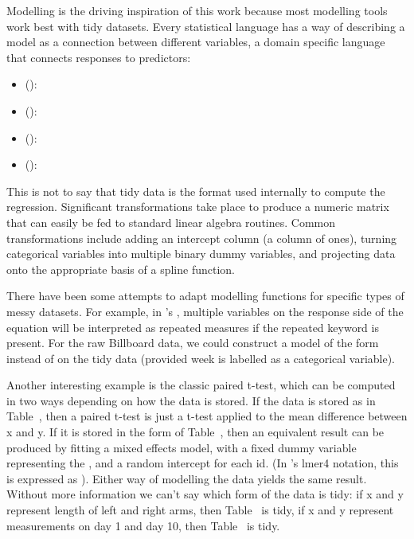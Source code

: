 \documentclass[article]{jss}
\begin{document}
Modelling is the driving inspiration of this work because most modelling tools work best with tidy datasets. Every statistical language has a way of describing a model as a connection between different variables, a domain specific language that connects responses to predictors: 

\begin{itemize}

  \item {} (): 

  \item {} (): 

  \item {} (): 

  \item {} (): 


\end{itemize}

This is not to say that tidy data is the format used internally to compute the regression. Significant transformations take place to produce a numeric matrix that can easily be fed to standard linear algebra routines. Common transformations include adding an intercept column (a column of ones), turning categorical variables into multiple binary dummy variables, and projecting data onto the appropriate basis of a spline function.


There have been some attempts to adapt modelling functions for specific types of messy datasets. For example, in 's , multiple variables on the response side of the equation will be interpreted as repeated measures if the {\sc repeated} keyword is present. For the raw Billboard data, we could construct a model of the form  instead of  on the tidy data (provided week is labelled as a categorical variable). 

Another interesting example is the classic paired t-test, which can be computed in two ways depending on how the data is stored. If the data is stored as in Table~, then a paired t-test is just a t-test applied to the mean difference between x and y. If it is stored in the form of Table~, then an equivalent result can be produced by fitting a mixed effects model, with a fixed dummy variable representing the , and a random intercept for each id. (In 's lmer4 notation, this is expressed as ). Either way of modelling the data yields the same result. Without more information we can't say which form of the data is tidy: if x and y represent length of left and right arms, then Table~ is tidy, if x and y represent measurements on day 1 and day 10, then Table~ is tidy.
\end{document}
